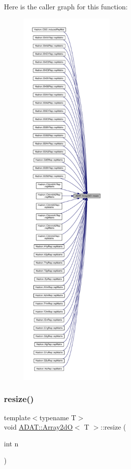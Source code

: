 Here is the caller graph for this function\+:
\nopagebreak
\begin{figure}[H]
\begin{center}
\leavevmode
\includegraphics[height=550pt]{da/d08/classADAT_1_1Array2dO_abccbac468c29e2d8a24b9cd317e92247_icgraph}
\end{center}
\end{figure}
\mbox{\label{classADAT_1_1Array2dO_aebe81d1fc5cdfea1b7a36effad3fb2e2}} 
\subsubsection{\texorpdfstring{resize()}{resize()}\hspace{0.1cm}{\footnotesize\ttfamily [4/6]}}
{\footnotesize\ttfamily template$<$typename T$>$ \\
void \mbox{\hyperlink{classADAT_1_1Array2dO}{A\+D\+A\+T\+::\+Array2dO}}$<$ T $>$\+::resize (\begin{DoxyParamCaption}\item[{int}]{n }\end{DoxyParamCaption})\hspace{0.3cm}{\ttfamily [inline]}}


